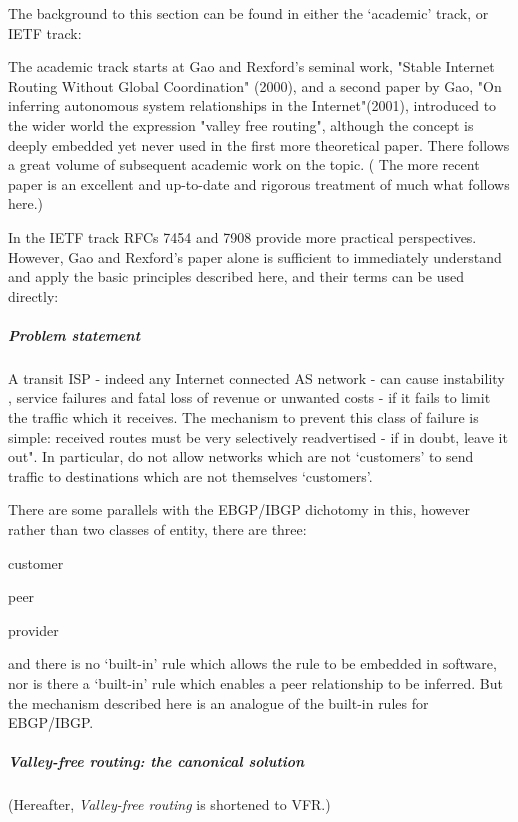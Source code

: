 The background to this section can be found in either the `academic' track, or IETF track:

The academic track starts at Gao and Rexford's seminal work, "Stable Internet Routing Without Global Coordination" \cite{gao2000}(2000), and a second paper by Gao, "On inferring autonomous system relationships in the Internet"\cite{gao2001b}(2001), introduced to the wider world the expression "valley free routing", although the concept is deeply embedded yet never used in the first more theoretical paper.   There follows a great volume of subsequent academic work on the topic.  ( The more recent paper  is an excellent and up-to-date and rigorous treatment of much what follows here.)

In the IETF track RFCs 7454\cite{rfc7454} and 7908\cite{rfc7908} provide more practical perspectives.  However, Gao and Rexford's paper alone is sufficient to immediately understand and apply the basic principles described here, and their terms can be used directly:

\subparagraph{Problem statement}
A transit ISP  - indeed any Internet connected AS network - can cause instability , service failures and fatal loss of revenue or unwanted costs - if it fails to limit the traffic which it receives.  The mechanism to prevent this class of failure is simple: received routes must be very selectively readvertised - if in doubt, leave it out".  In particular, do not allow networks which are not `customers' to send traffic to destinations which are not themselves `customers'.

There are some parallels with the EBGP/IBGP dichotomy in this, however rather than two classes of entity, there are three:
\begin{myitemize}
	\item customer
	\item peer
	\item provider
\end{myitemize}
and there is no `built-in' rule which allows the rule to be embedded in software, nor is there a `built-in' rule which enables a peer relationship to be inferred.  But the mechanism described here is an analogue of the built-in rules for EBGP/IBGP.
\subparagraph{Valley-free routing: the canonical solution}
(Hereafter, \textit{Valley-free routing} is shortened to VFR.)

